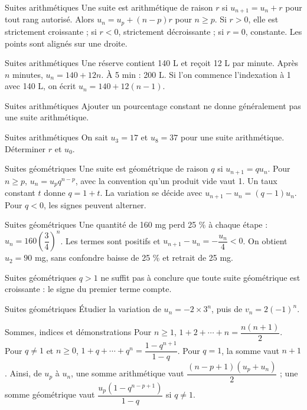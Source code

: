 \documentclass[aspectratio=169,10pt]{beamer}
\begin{document}
\begin{frame}{Suites arithmétiques}
Une suite est arithmétique de raison \(r\) si \(u_{n+1}=u_n+r\) pour tout rang autorisé. Alors \(u_n=u_p+(n-p)r\) pour \(n\geq p\). Si \(r>0\), elle est strictement croissante ; si \(r<0\), strictement décroissante ; si \(r=0\), constante. Les points sont alignés sur une droite.
\end{frame}
\begin{frame}{Suites arithmétiques}
Une réserve contient 140 L et reçoit 12 L par minute. Après \(n\) minutes, \(u_n=140+12n\). À 5 min : 200 L. Si l’on commence l’indexation à 1 avec 140 L, on écrit \(u_n=140+12(n-1)\).
\end{frame}
\begin{frame}{Suites arithmétiques}
Ajouter un pourcentage constant ne donne généralement pas une suite arithmétique.
\end{frame}
\begin{frame}{Suites arithmétiques}
On sait \(u_3=17\) et \(u_8=37\) pour une suite arithmétique. Déterminer \(r\) et \(u_0\).
\end{frame}
\begin{frame}{Suites géométriques}
Une suite est géométrique de raison \(q\) si \(u_{n+1}=qu_n\). Pour \(n\geq p\), \(u_n=u_pq^{n-p}\), avec la convention qu’un produit vide vaut 1. Un taux constant \(t\) donne \(q=1+t\). La variation se décide avec \(u_{n+1}-u_n=(q-1)u_n\). Pour \(q<0\), les signes peuvent alterner.
\end{frame}
\begin{frame}{Suites géométriques}
Une quantité de 160 mg perd 25 \% à chaque étape : \(u_n=160(\dfrac{3}{4})^n\). Les termes sont positifs et \(u_{n+1}-u_n=-\dfrac{u_n}{4}<0\). On obtient \(u_2=90\) mg, sans confondre baisse de 25 \% et retrait de 25 mg.
\end{frame}
\begin{frame}{Suites géométriques}
\(q>1\) ne suffit pas à conclure que toute suite géométrique est croissante : le signe du premier terme compte.
\end{frame}
\begin{frame}{Suites géométriques}
Étudier la variation de \(u_n=-2\times3^n\), puis de \(v_n=2(-1)^n\).
\end{frame}
\begin{frame}{Sommes, indices et démonstrations}
Pour \(n\geq1\), \(1+2+\cdots +n=\dfrac{n(n+1)}{2}\). Pour \(q\ne1\) et \(n\geq0\), \(1+q+\cdots +q^n=\dfrac{1-q^{n+1}}{1-q}\). Pour \(q=1\), la somme vaut \(n+1\). Ainsi, de \(u_p\) à \(u_n\), une somme arithmétique vaut \(\dfrac{(n-p+1)(u_p+u_n)}{2}\) ; une somme géométrique vaut \(\dfrac{u_p(1-q^{n-p+1})}{1-q}\) si \(q\ne1\).
\end{frame}
\end{document}

